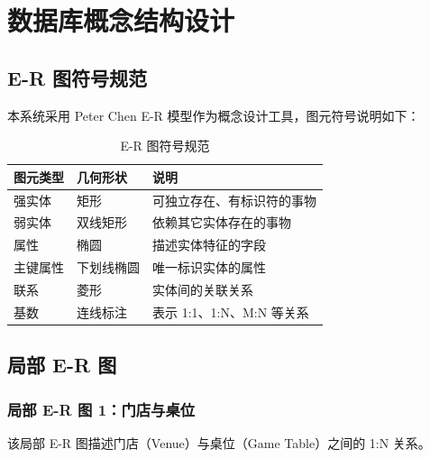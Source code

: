 \chapter{数据库概念结构设计}

\section{E-R 图符号规范}

本系统采用 Peter Chen E-R 模型作为概念设计工具，图元符号说明如下：

\begin{table}[H]
  \centering
  \footnotesize
  \caption{E-R 图符号规范}
  \label{tab:er_symbols}
  \begin{tabularx}{\textwidth}{|p{2cm}|p{2cm}|X|}
    \hline
    \textbf{图元类型} & \textbf{几何形状} & \textbf{说明} \\
    \hline
    强实体 & 矩形 & 可独立存在、有标识符的事物 \\
    \hline
    弱实体 & 双线矩形 & 依赖其它实体存在的事物 \\
    \hline
    属性 & 椭圆 & 描述实体特征的字段 \\
    \hline
    主键属性 & 下划线椭圆 & 唯一标识实体的属性 \\
    \hline
    联系 & 菱形 & 实体间的关联关系 \\
    \hline
    基数 & 连线标注 & 表示 1:1、1:N、M:N 等关系 \\
    \hline
  \end{tabularx}
\end{table}

\section{局部 E-R 图}

\subsection{局部 E-R 图 1：门店与桌位}

该局部 E-R 图描述门店（Venue）与桌位（Game Table）之间的 1:N 关系。

